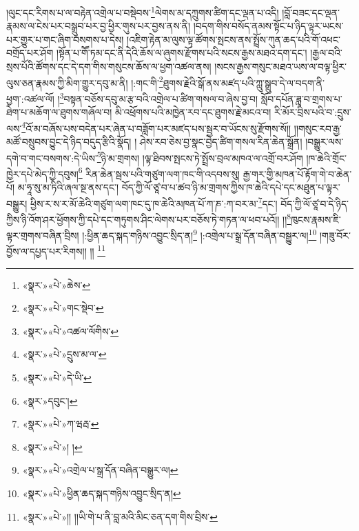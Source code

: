 །ལུང་དང་རིགས་པ་ལ་བརྟེན་འགྲེལ་པ་བསྡེབས་\footnote{«སྣར་»«པེ་»ཆེས་}ལེགས་མ་དཀྲུགས་ཚིག་དང་ལྡན་པ་འདི། །བློ་བཟང་དང་ལྡན་རྣམས་ལ་ངེས་པར་བསྒྲུབ་པར་བྱ་ཕྱིར་གུས་པར་བྱས་ནས་ནི། །བདག་གིས་བསོད་ནམས་སྟོང་པ་ཉིད་ལྟར་ཡངས་པར་གྱུར་པ་གང་ཞིག་བསགས་པ་དེས། །འཇིག་རྟེན་མ་ལུས་ལྟ་ཚོགས་སྤངས་ནས་སྤྲོས་ཀུན་ཆད་པའི་གོ་འཕང་བགྲོད་པར་ཤོག །སྟོན་པ་གཽ་ཏམ་དང་ནི་དེའི་ཆོས་ལ་ཞུགས་རྫོགས་པའི་སངས་རྒྱས་མཐའ་དག་དང་། །རྒྱལ་བའི་སྲས་པོའི་ཚོགས་དང་དེ་དག་གིས་གསུངས་ཆོས་ལ་ཕྱག་འཚལ་ནས། །སངས་རྒྱས་གསུང་མཐའ་ཡས་ལ་བལྟ་ཕྱིར་ལུས་ཅན་རྣམས་ཀྱི་མིག་གྱུར་དབུ་མ་ནི། །:གང་གི་\footnote{«སྣར་»«པེ་»གང་སྡེབ་}ཐུགས་རྗེའི་སྒོ་ནས་མཛད་པའི་ཀླུ་སྒྲུབ་དེ་ལ་བདག་ནི་ཕྱག་:འཚལ་ལོ། །\footnote{«སྣར་»«པེ་»འཚལ་ལོགིས་}བསྟན་བཅོས་དབུ་མ་རྩ་བའི་འགྲེལ་པ་ཚིག་གསལ་བ་ཞེས་བྱ་བ། སློབ་དཔོན་ཟླ་བ་གྲགས་པ་ཐེག་པ་མཆོག་ལ་ཐུགས་གཞོལ་བ། མི་འཕྲོགས་པའི་མཁྱེན་རབ་དང་ཐུགས་རྗེ་མངའ་བ། རི་མོར་བྲིས་པའི་བ་:དྲུས་ལས་\footnote{«སྣར་»«པེ་»དྲུས་མ་ལ་}འོ་མ་བཞོས་པས་བདེན་པར་ཞེན་པ་བཟློག་པར་མཛད་པས་སྦྱར་བ་ཡོངས་སུ་རྫོགས་སོ།། །།གསུང་རབ་རྒྱ་མཚོ་བསྲུབས་བྱུང་དེ་ཉིད་བདུད་རྩིའི་སྣོད། །
ཤེས་རབ་ཅེས་བྱ་སྣང་བྱེད་ཚིག་གསལ་རིན་ཆེན་སྒྲོན། །བསྒྱུར་ལས་དགེ་བ་གང་བསགས་:དེ་ཡིས་\footnote{«སྣར་»«པེ་»དེ་ཡི་}ཉི་མ་གྲགས། །ལྟ་ཐིབས་སྤངས་ཏེ་སྤྲོས་བྲལ་མཁའ་ལ་འགྲོ་བར་ཤོག །ཁ་ཆེའི་གྲོང་ཁྱེར་དཔེ་མེད་ཀྱི་དབུས།\footnote{«སྣར་»དབུང་།} རིན་ཆེན་སྦས་པའི་གཙུག་ལག་ཁང་གི་འདབས་སུ། རྒྱ་གར་གྱི་མཁན་པོ་རྟོག་གེ་བ་ཆེན་པོ། མ་ཧཱ་སུ་མ་ཏིའི་ཞལ་སྔ་ནས་དང་། བོད་ཀྱི་ལོ་ཙཱ་བ་པ་ཚབ་ཉི་མ་གྲགས་ཀྱིས་ཁ་ཆེའི་དཔེ་དང་མཐུན་པ་ལྟར་བསྒྱུར། ཕྱིས་ར་ས་ར་མོ་ཆེའི་གཙུག་ལག་ཁང་དུ་ཁ་ཆེའི་མཁན་པོ་ཀ་ཎ་:ཀ་བར་མ་\footnote{«སྣར་»«པེ་»ཀ་ཝརྦ་}དང་། བོད་ཀྱི་ལོ་ཙཱ་བ་དེ་ཉིད་ཀྱིས་ཉི་འོག་ཤར་ཕྱོགས་ཀྱི་དཔེ་དང་གཏུགས་ཤིང་ལེགས་པར་བཅོས་ཏེ་གཏན་ལ་ཕབ་པའོ།། །།\footnote{«སྣར་»«པེ་»། །}ཁུངས་རྣམས་ཇི་ལྟར་གྲགས་བཞིན་བྲིས། །:ཕྱིན་ཆད་སྐད་གཉིས་འབྱུང་སྲིད་ན།\footnote{«སྣར་»«པེ་»འགྲེལ་པ་སྒྲ་དོན་བཞིན་བསྒྱུར་ལ།} །:འགྲེལ་པ་སྒྲ་དོན་བཞིན་བསྒྱུར་ལ།\footnote{«སྣར་»«པེ་»ཕྱིན་ཆད་སྐད་གཉིས་འབྱུང་སྲིད་ན།} །གཟུ་བོར་བྱོས་ལ་དཔྱད་པར་རིགས།། །། \footnote{«སྣར་»«པེ་»།། །།ཡི་གེ་པ་ནི་བླ་མའི་མིང་ཅན་དག་གིས་བྲིས་}
